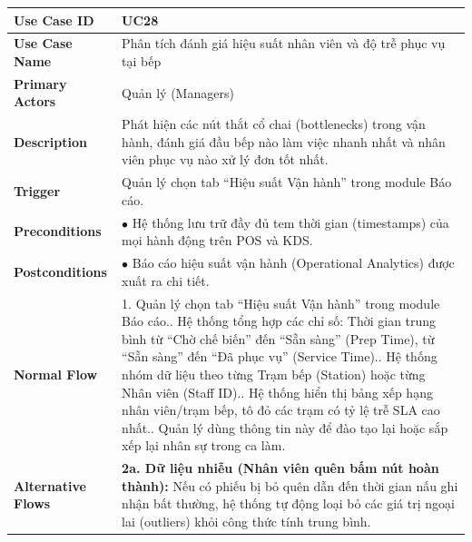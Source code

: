 \begin{longtable}{|L{3.5cm}|L{12.5cm}|}
\hline
\textbf{Use Case ID} & UC28 \\ \hline
\textbf{Use Case Name} & Phân tích đánh giá hiệu suất nhân viên và độ trễ phục vụ tại bếp \\ \hline
\textbf{Primary Actors} & Quản lý (Managers) \\ \hline
\textbf{Description} & Phát hiện các nút thắt cổ chai (bottlenecks) trong vận hành, đánh giá đầu bếp nào làm việc nhanh nhất và nhân viên phục vụ nào xử lý đơn tốt nhất. \\ \hline
\textbf{Trigger} & Quản lý chọn tab ``Hiệu suất Vận hành'' trong module Báo cáo. \\ \hline
\textbf{Preconditions} & $\bullet$ Hệ thống lưu trữ đầy đủ tem thời gian (timestamps) của mọi hành động trên POS và KDS. \\ \hline
\textbf{Postconditions} & $\bullet$ Báo cáo hiệu suất vận hành (Operational Analytics) được xuất ra chi tiết. \\ \hline
\textbf{Normal Flow} &
1. Quản lý chọn tab ``Hiệu suất Vận hành'' trong module Báo cáo.. Hệ thống tổng hợp các chỉ số: Thời gian trung bình từ ``Chờ chế biến'' đến ``Sẵn sàng'' (Prep Time), từ ``Sẵn sàng'' đến ``Đã phục vụ'' (Service Time).. Hệ thống nhóm dữ liệu theo từng Trạm bếp (Station) hoặc từng Nhân viên (Staff ID).. Hệ thống hiển thị bảng xếp hạng nhân viên/trạm bếp, tô đỏ các trạm có tỷ lệ trễ SLA cao nhất.. Quản lý dùng thông tin này để đào tạo lại hoặc sắp xếp lại nhân sự trong ca làm. \\ \hline
\textbf{Alternative Flows} &
\textbf{2a. Dữ liệu nhiễu (Nhân viên quên bấm nút hoàn thành):} Nếu có phiếu bị bỏ quên dẫn đến thời gian nấu ghi nhận bất thường, hệ thống tự động loại bỏ các giá trị ngoại lai (outliers) khỏi công thức tính trung bình. \\ \hline
\end{longtable}

